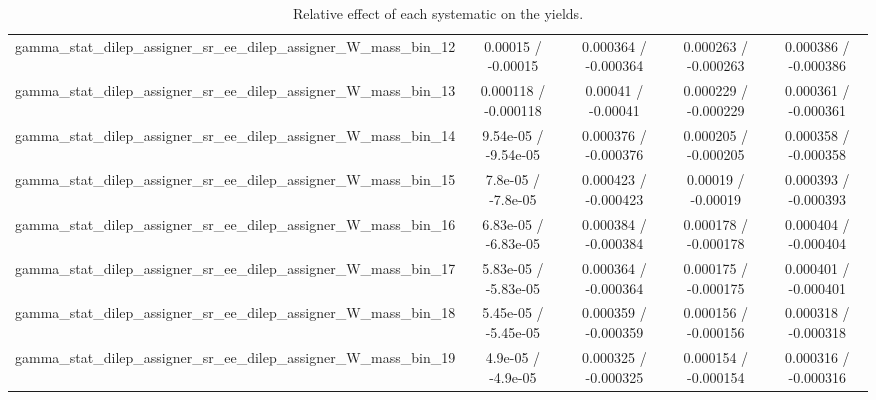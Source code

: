 \documentclass[10pt]{article}
\begin{document}
\begin{table}[htbp]
\begin{center}
\begin{tabular}{|c|c|c|c|c|}
  gamma_stat_dilep_assigner_sr_ee_dilep_assigner_W_mass_bin_12 & 0.00015 / -0.00015 & 0.000364 / -0.000364 & 0.000263 / -0.000263 & 0.000386 / -0.000386 \\ 
  gamma_stat_dilep_assigner_sr_ee_dilep_assigner_W_mass_bin_13 & 0.000118 / -0.000118 & 0.00041 / -0.00041 & 0.000229 / -0.000229 & 0.000361 / -0.000361 \\ 
  gamma_stat_dilep_assigner_sr_ee_dilep_assigner_W_mass_bin_14 & 9.54e-05 / -9.54e-05 & 0.000376 / -0.000376 & 0.000205 / -0.000205 & 0.000358 / -0.000358 \\ 
  gamma_stat_dilep_assigner_sr_ee_dilep_assigner_W_mass_bin_15 & 7.8e-05 / -7.8e-05 & 0.000423 / -0.000423 & 0.00019 / -0.00019 & 0.000393 / -0.000393 \\ 
  gamma_stat_dilep_assigner_sr_ee_dilep_assigner_W_mass_bin_16 & 6.83e-05 / -6.83e-05 & 0.000384 / -0.000384 & 0.000178 / -0.000178 & 0.000404 / -0.000404 \\ 
  gamma_stat_dilep_assigner_sr_ee_dilep_assigner_W_mass_bin_17 & 5.83e-05 / -5.83e-05 & 0.000364 / -0.000364 & 0.000175 / -0.000175 & 0.000401 / -0.000401 \\ 
  gamma_stat_dilep_assigner_sr_ee_dilep_assigner_W_mass_bin_18 & 5.45e-05 / -5.45e-05 & 0.000359 / -0.000359 & 0.000156 / -0.000156 & 0.000318 / -0.000318 \\ 
  gamma_stat_dilep_assigner_sr_ee_dilep_assigner_W_mass_bin_19 & 4.9e-05 / -4.9e-05 & 0.000325 / -0.000325 & 0.000154 / -0.000154 & 0.000316 / -0.000316 \\ 
\hline 
\end{tabular} 
\caption{Relative effect of each systematic on the yields.} 
\end{center} 
\end{table} 
\end{document}
